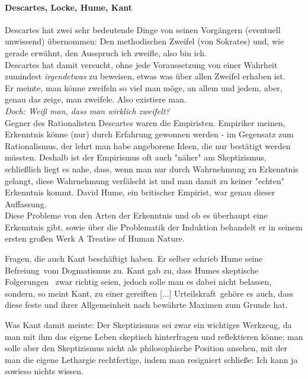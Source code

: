 \documentclass[11pt,a4paper]{article}
\begin{document}
		\paragraph{Descartes, Locke, Hume, Kant}
Descartes hat zwei sehr bedeutende Dinge von seinen Vorgängern (eventuell unwissend) übernommen: Den methodischen Zweifel (von Sokrates) und, wie gerade erwähnt, den Ausspruch \glqq ich zweifle, also bin ich\grqq.\\%
Descartes hat damit versucht, ohne jede Voraussetzung von einer Wahrheit zumindest \emph{irgendetwas} zu \glqq beweisen\grqq, etwas was über allen Zweifel erhaben ist.\\
Er meinte, man könne zweifeln so viel man möge, an allem und jedem, aber, genau das zeige, man zweifele. Also existiere man.\\ %
\emph{Doch: Weiß man, dass man wirklich zweifelt?}\\ %

Gegner des Rationalisten Descartes waren die Empiristen. Empiriker meinen, Erkenntnis könne (nur) durch Erfahrung gewonnen werden - im Gegensatz zum Rationalismus, der lehrt man habe angeborene Ideen, die nur bestätigt werden müssten. Deshalb ist der Empirismus oft auch "näher" am Skeptizismus, schließlich liegt es nahe, dass, wenn man nur durch Wahrnehmung zu Erkenntnis gelangt, diese Wahrnehmung verfälscht ist und man damit zu keiner "echten" Erkenntnis kommt. David Hume, ein britischer Empirist, war genau dieser Auffassung.\\ %
Diese Probleme von den Arten der Erkenntnis und ob es überhaupt eine Erkenntnis gibt, sowie über die Problematik der Induktion behandelt er in seinem ersten großen Werk \glqq A Treatise of Human Nature\grqq.

Fragen, die auch Kant beschäftigt haben. Er selber schrieb Hume seine \glqq Befreiung\grqq\ vom Dogmatismus zu. Kant gab zu, dass Humes skeptische Folgerungen%
\ zwar richtig seien, jedoch solle man es dabei nicht belassen, sondern, so meint Kant, zu einer  \glqq gereiften [...] Urteilskraft\grqq\ gehöre es auch, dass diese \glqq feste und ihrer Allgemeinheit nach bewährte Maximen zum Grunde hat\grqq.%

Was Kant damit meinte: Der Skeptizismus sei zwar ein wichtiges Werkzeug, da man mit ihm das eigene Leben skeptisch hinterfragen und reflektieren könne; man solle aber den Skeptizismus nicht als philosophische Position ansehen, mit der man die eigene Lethargie rechtfertige, indem man resigniert schließe: \glqq Ich kann ja sowieso nichts wissen\grqq .
\end{document}
